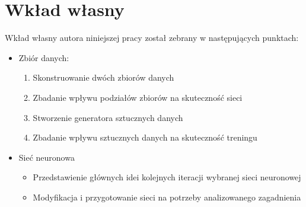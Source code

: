 \section{Wkład własny}

Wkład własny autora niniejszej pracy został zebrany w następujących punktach:

\begin{itemize}
	\item Zbiór danych:
    \begin{enumerate}
      \item Skonstruowanie dwóch zbiorów danych 
      \item Zbadanie wpływu podziałów zbiorów na skuteczność sieci 
			\item Stworzenie generatora sztucznych danych 
			\item Zbadanie wpływu sztucznych danych na skuteczność treningu 
		\end{enumerate}
	\item Sieć neuronowa
	\begin{itemize}
		\item Przedstawienie głównych idei kolejnych iteracji wybranej sieci neuronowej 
		\item Modyfikacja i przygotowanie sieci na potrzeby analizowanego zagadnienia 
	\end{itemize}
\end{itemize}
